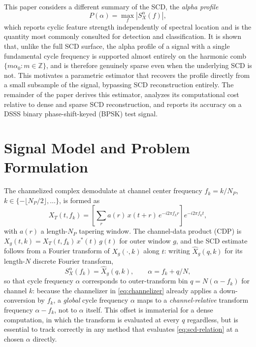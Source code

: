 \documentclass[10pt,twocolumn]{article}
\begin{document}
This paper considers a different summary of the SCD, the \emph{alpha
profile}
\begin{equation}
P(\alpha) = \max_{f} \left| S_X^{\alpha}(f) \right|,
\label{eq:profile}
\end{equation}
which reports cyclic feature strength independently of spectral location
and is the quantity most commonly consulted for detection and
classification. It is shown that, unlike the full SCD surface, the alpha
profile of a signal with a single fundamental cycle frequency is supported
almost entirely on the harmonic comb $\{m\alpha_0 : m \in \mathbb{Z}\}$,
and is therefore genuinely sparse even when the underlying SCD is not.
This motivates a parametric estimator that recovers the profile directly
from a small subsample of the signal, bypassing SCD reconstruction
entirely. The remainder of the paper derives this estimator, analyzes its
computational cost relative to dense and sparse SCD reconstruction, and
reports its accuracy on a DSSS binary phase-shift-keyed (BPSK) test signal.

\section{Signal Model and Problem Formulation}

The channelized complex demodulate at channel center frequency
$f_k = k/N_P$, $k \in \{-\lfloor N_P/2 \rfloor, \dots\}$, is formed as
\begin{equation}
X_T(t,f_k) = \left[ \sum_{r} a(r)\, x(t+r)\, e^{-i2\pi f_k r} \right]
             e^{-i2\pi f_k t},
\label{eq:channelizer}
\end{equation}
with $a(r)$ a length-$N_P$ tapering window. The channel-data product (CDP)
is $X_g(t,k) = X_T(t,f_k)\, x^{*}(t)\, g(t)$ for outer window $g$, and the
SCD estimate follows from a Fourier transform of $X_g(\cdot,k)$ along $t$:
writing $\widehat{X}_g(q,k)$ for its length-$N$ discrete Fourier transform,
\begin{equation}
S_X^{\alpha}(f_k) = \widehat{X}_g(q,k), \qquad \alpha = f_k + q/N,
\label{eq:scd-relation}
\end{equation}
so that cycle frequency $\alpha$ corresponds to outer-transform bin
$q = N(\alpha - f_k)$ for channel $k$: because the channelizer in
\eqref{eq:channelizer} already applies a down-conversion by $f_k$, a
\emph{global} cycle frequency $\alpha$ maps to a \emph{channel-relative}
transform frequency $\alpha - f_k$, not to $\alpha$ itself. This offset is
immaterial for a dense computation, in which the transform is evaluated at
every $q$ regardless, but is essential to track correctly in any method
that evaluates \eqref{eq:scd-relation} at a chosen $\alpha$ directly.
\end{document}
